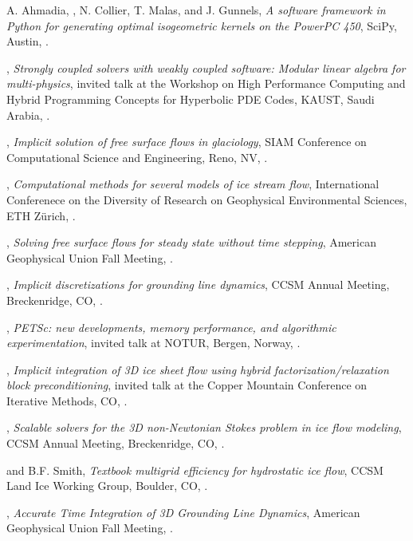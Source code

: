\documentclass[10pt,letterpaper]{article}
\newcommand\ptitle[1]{\textit{#1}} %
\renewenvironment{itemize}{
  \begin{list}{}{
    \setlength{\leftmargin}{1.5em}
    \setlength{\itemsep}{0.25em}
    \setlength{\parskip}{0pt}
    \setlength{\parsep}{0.25em}
  }
}{
  \end{list}
}
\begin{document}
\begin{itemize}
\item A. Ahmadia, {\JedBrown}, N. Collier, T. Malas, and J. Gunnels, \ptitle{A software framework in Python for generating optimal isogeometric kernels on the PowerPC 450}, SciPy, Austin, .
\item {\JedBrown}, \ptitle{Strongly coupled solvers with weakly coupled software: Modular linear algebra for multi-physics}, invited talk at the Workshop on High Performance Computing and Hybrid Programming Concepts for Hyperbolic PDE Codes, KAUST, Saudi Arabia, .
\item {\JedBrown}, \ptitle{Implicit solution of free surface flows in glaciology}, SIAM Conference on Computational Science and Engineering, Reno, NV, .
\item {\JedBrown}, \ptitle{Computational methods for several models of ice stream flow}, International Conferenece on the Diversity of Research on Geophysical Environmental Sciences, ETH Z\"urich, .
\item {\JedBrown}, \ptitle{Solving free surface flows for steady state without time stepping}, American Geophysical Union Fall Meeting, .
\item {\JedBrown}, \ptitle{Implicit discretizations for grounding line dynamics}, CCSM Annual Meeting, Breckenridge, CO,  .
\item {\JedBrown}, \ptitle{PETSc: new developments, memory performance, and algorithmic experimentation}, invited talk at NOTUR, Bergen, Norway, .
\item {\JedBrown}, \ptitle{Implicit integration of 3D ice sheet flow using hybrid factorization/relaxation block preconditioning}, invited talk at the Copper Mountain Conference on Iterative Methods, CO, .
\item {\JedBrown}, \ptitle{Scalable solvers for the 3D non-Newtonian Stokes problem in ice flow modeling}, CCSM Annual Meeting, Breckenridge, CO, .
\item {\JedBrown} and B.F. Smith, \ptitle{Textbook multigrid efficiency for hydrostatic ice flow}, CCSM Land Ice Working Group, Boulder, CO, .
\item {\JedBrown}, \ptitle{Accurate Time Integration of 3D Grounding Line Dynamics}, American Geophysical Union Fall Meeting, .
\end{itemize}
\end{document}
